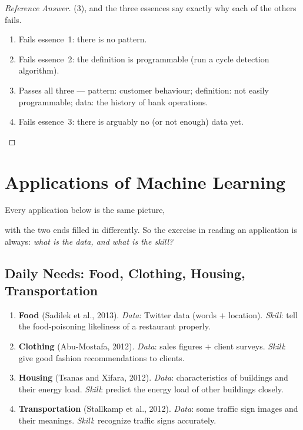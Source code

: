 \begin{proof}[Reference Answer]
    (3), and the three essences say exactly why each of the others fails.
    \begin{enumerate}[(1)]
        \item Fails essence~1: there is no pattern.
        \item Fails essence~2: the definition is programmable (run a cycle
            detection algorithm).
        \item Passes all three --- pattern: customer behaviour; definition: not
            easily programmable; data: the history of bank operations.
        \item Fails essence~3: there is arguably no (or not enough) data yet.
    \end{enumerate}
\end{proof}

\section{Applications of Machine Learning}\label{sec:applications}


Every application below is the same picture,
\begin{center}
\end{center}
with the two ends filled in differently. So the exercise in reading an
application is always: \emph{what is the data, and what is the skill?}

\subsection{Daily Needs: Food, Clothing, Housing, Transportation}

\begin{enumerate}
    \item \textbf{Food} (Sadilek et al., 2013).
        \emph{Data}: Twitter data (words \(+\) location).
        \emph{Skill}: tell the food-poisoning likeliness of a restaurant
        properly.
    \item \textbf{Clothing} (Abu-Mostafa, 2012).
        \emph{Data}: sales figures \(+\) client surveys.
        \emph{Skill}: give good fashion recommendations to clients.
    \item \textbf{Housing} (Tsanas and Xifara, 2012).
        \emph{Data}: characteristics of buildings and their energy load.
        \emph{Skill}: predict the energy load of other buildings closely.
    \item \textbf{Transportation} (Stallkamp et al., 2012).
        \emph{Data}: some traffic sign images and their meanings.
        \emph{Skill}: recognize traffic signs accurately.
\end{enumerate}

